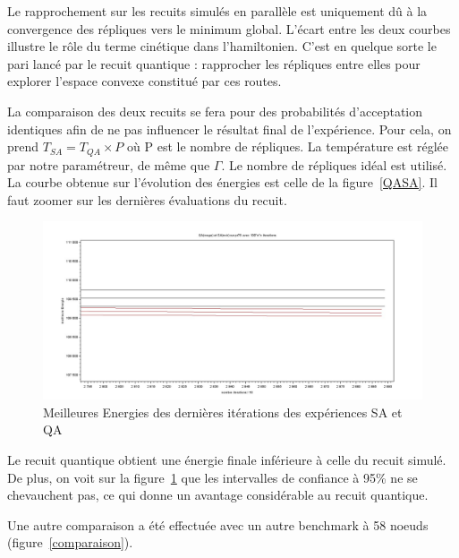 \documentclass{article}%
\begin{document}
		Le rapprochement sur les recuits simulés en parallèle est uniquement dû à la convergence des répliques vers le minimum global. L'écart entre les deux courbes illustre le rôle du terme cinétique dans l'hamiltonien. C'est en quelque sorte le pari lancé par le recuit quantique : rapprocher les répliques entre elles pour explorer l'espace convexe constitué par ces routes.
		
		\vspace{1cm}
		La comparaison des deux recuits se fera pour des probabilités d'acceptation identiques afin de ne pas influencer le résultat final de l'expérience. Pour cela, on prend $T_{SA} = T_{QA} \times P $ où P est le nombre de répliques. La température est réglée par notre paramétreur, de même que $\Gamma$. Le nombre de répliques idéal est utilisé. La courbe obtenue sur l'évolution des énergies est celle de la figure~\ref{QASA}. Il faut zoomer sur les dernières évaluations du recuit.
		
	\begin{figure}[ht]
	
	\begin{center}
	\includegraphics[scale=0.25]{zoom_pr76.jpg}
	\caption{Meilleures Energies des dernières itérations des expériences SA et QA}
	\label{fin}

	\end{center}
		
	\end{figure}
	
		Le recuit quantique obtient une énergie finale inférieure à celle du recuit simulé. De plus, on voit sur la figure~\ref{fin} que les intervalles de confiance à 95\% ne se chevauchent pas, ce qui donne un avantage considérable au recuit quantique.
		
		Une autre comparaison a été effectuée avec un autre benchmark à 58 noeuds (figure~\ref{comparaison}).
	
\end{document}
